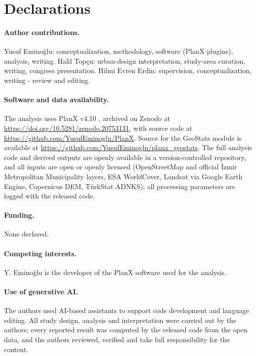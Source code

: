 \section*{Declarations}

\paragraph{Author contributions.}
Yusuf Emino\u{g}lu: conceptualization, methodology, software (PlanX plugins),
analysis, writing. Halil Top\c{c}u: urban-design interpretation, study-area
curation, writing, congress presentation. Hilmi Evren Erdin: supervision,
conceptualization, writing - review and editing.

\paragraph{Software and data availability.}
The analysis uses PlanX v4.10
\citep{eminoglu2026planxresilience}, archived on Zenodo
at \url{https://doi.org/10.5281/zenodo.20753131}, with source code at
\url{https://github.com/YusufEminoglu/PlanX}. Source for the
GeoStats module is available at
\url{https://github.com/YusufEminoglu/planx_geostats}. The full analysis code and
derived outputs are openly available in a version-controlled repository, and all
inputs are open or openly licensed
(OpenStreetMap and official \.{I}zmir Metropolitan Municipality layers, ESA WorldCover,
Landsat via Google Earth Engine, Copernicus DEM, T\"urkStat ADNKS); all processing
parameters are logged with the released code.

\paragraph{Funding.} None declared.

\paragraph{Competing interests.}
Y. Emino\u{g}lu is the developer of the PlanX software used for the analysis.

\paragraph{Use of generative AI.}
The authors used AI-based assistants to support code development and language
editing. All study design, analysis and interpretation were carried out by the
authors; every reported result was computed by the released code from the open
data, and the authors reviewed, verified and take full responsibility for the
content.
